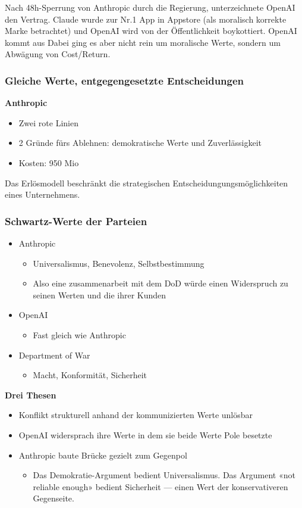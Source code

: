 Nach 48h-Sperrung von Anthropic durch die Regierung, unterzeichnete OpenAI den Vertrag. Claude wurde zur Nr.1 App in Appstore (als moralisch korrekte Marke betrachtet) und OpenAI wird von der Öffentlichkeit boykottiert. OpenAI kommt aus  
Dabei ging es aber nicht rein um moralische Werte, sondern um Abwägung von Cost/Return.
\pagebreak
\subsubsection{Gleiche Werte, entgegengesetzte Entscheidungen}

\textbf{Anthropic}

\begin{itemize}
    \item Zwei rote Linien
    \item 2 Gründe fürs Ablehnen: demokratische Werte und Zuverlässigkeit
    \item Kosten: 950 Mio
\end{itemize}

Das Erlösmodell beschränkt die strategischen Entscheidungungsmöglichkeiten eines Unternehmens.

\subsubsection{Schwartz-Werte der Parteien}

\begin{itemize}
    \item Anthropic
\begin{itemize}
    \item Universalismus, Benevolenz, Selbstbestimmung
    \item Also eine zusammenarbeit mit dem DoD würde einen Widerspruch zu seinen Werten und die ihrer Kunden
\end{itemize}
\item OpenAI
\begin{itemize}
    \item Fast gleich wie Anthropic
\end{itemize}
\item Department of War
\begin{itemize}
    \item Macht, Konformität, Sicherheit
\end{itemize}
\end{itemize}

\textbf{Drei Thesen}

\begin{itemize}
    \item Konflikt strukturell anhand der kommunizierten Werte unlösbar
    \item OpenAI widersprach ihre Werte in dem sie beide Werte Pole besetzte
    \item Anthropic baute Brücke gezielt zum Gegenpol
    \begin{itemize}
        \item Das Demokratie-Argument bedient Universalismus. Das Argument «not reliable enough» bedient Sicherheit — einen Wert der konservativeren Gegenseite.
    \end{itemize}
\end{itemize}

